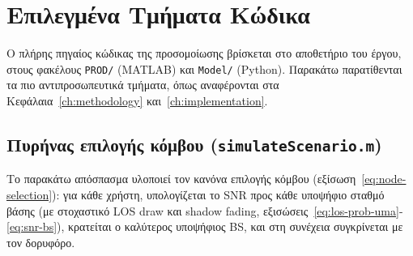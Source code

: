 \chapter{Επιλεγμένα Τμήματα Κώδικα}
\label{ch:appendix-code}

Ο πλήρης πηγαίος κώδικας της προσομοίωσης βρίσκεται στο αποθετήριο του
έργου, στους φακέλους \texttt{PROD/} (MATLAB) και \texttt{Model/}
(Python). Παρακάτω παρατίθενται τα πιο αντιπροσωπευτικά τμήματα, όπως
αναφέρονται στα Κεφάλαια~\ref{ch:methodology} και~\ref{ch:implementation}.

\section{Πυρήνας επιλογής κόμβου (\texttt{simulateScenario.m})}
\label{sec:appendix-simulatescenario}

Το παρακάτω απόσπασμα υλοποιεί τον κανόνα επιλογής κόμβου
(εξίσωση~\eqref{eq:node-selection}): για κάθε χρήστη, υπολογίζεται το SNR
προς κάθε υποψήφιο σταθμό βάσης (με στοχαστικό LOS draw και shadow fading,
εξισώσεις~\eqref{eq:los-prob-uma}-\eqref{eq:snr-bs}), κρατείται ο
καλύτερος υποψήφιος BS, και στη συνέχεια συγκρίνεται με τον δορυφόρο.

